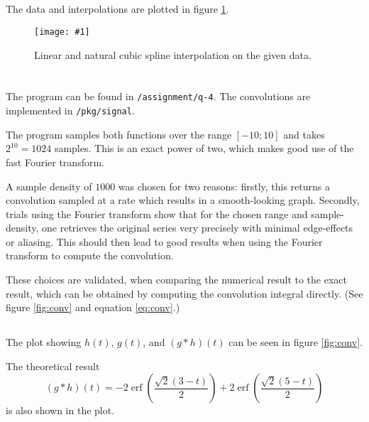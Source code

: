 \documentclass[10pt, a4paper]{article}
\newcommand{\plot}[3]{\begin{figure}[ht]\centering\texttt{[image: \#1]}\caption{#2}\label{#3}\end{figure}}
\begin{document}
  \subsection{}
  The data and interpolations are plotted in figure \ref{fig:interpolate}.

  \plot{assignment-q-3}{
    Linear and natural cubic spline interpolation on the given data.
  }{fig:interpolate}

\section{}
  \subsection{}
  The program can be found in \texttt{/assignment/q-4}. The convolutions are implemented in \texttt{/pkg/signal}.

  The program samples both functions over the range $[-10; 10]$ and takes $2^{10} = 1024$ samples. This
  is an exact power of two, which makes good use of the fast Fourier transform.

  A sample density of $1000$ was chosen for two reasons: firstly, this returns a convolution
  sampled at a rate which results in a smooth-looking graph. Secondly, trials using the Fourier
  transform show that for the chosen range and sample-density, one retrieves the original series very
  precisely with minimal edge-effects or aliasing. This should then lead to good results when
  using the Fourier transform to compute the convolution.

  These choices are validated, when comparing the numerical result to the exact result, which can
  be obtained by computing the convolution integral directly. (See figure \ref{fig:conv} and equation
  \ref{eq:conv}.)

  \subsection{}
  The plot showing $h(t)$, $g(t)$, and $(g * h)(t)$ can be seen in figure \ref{fig:conv}.

  The theoretical result
  \begin{equation}
    \label{eq:conv}
    (g * h)(t) = - 2 \operatorname{erf}{\left(\frac{\sqrt{2} \left(3 - t\right)}{2} \right)} + 2 \operatorname{erf}{\left(\frac{\sqrt{2} \left(5 - t\right)}{2} \right)}
  \end{equation}
  is also shown in the plot.
\end{document}
